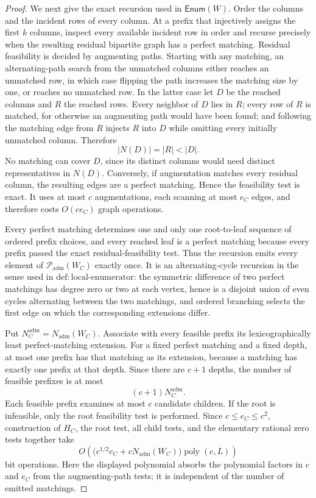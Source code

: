 \documentclass{article}
\begin{document}
\begin{proof}
We next give the exact recursion used in \(\mathsf{Enum}(W)\).  Order the columns and the incident rows of every column.  At a prefix that injectively assigns the first \(k\) columns, inspect every available incident row in order and recurse precisely when the resulting residual bipartite graph has a perfect matching.  Residual feasibility is decided by augmenting paths.  Starting with any matching, an alternating-path search from the unmatched columns either reaches an unmatched row, in which case flipping the path increases the matching size by one, or reaches no unmatched row.  In the latter case let \(D\) be the reached columns and \(R\) the reached rows.  Every neighbor of \(D\) lies in \(R\); every row of \(R\) is matched, for otherwise an augmenting path would have been found; and following the matching edge from \(R\) injects \(R\) into \(D\) while omitting every initially unmatched column.  Therefore
\[
 |N(D)|=|R|<|D|.
\]
No matching can cover \(D\), since its distinct columns would need distinct representatives in \(N(D)\).  Conversely, if augmentation matches every residual column, the resulting edges are a perfect matching.  Hence the feasibility test is exact.  It uses at most \(c\) augmentations, each scanning at most \(e_C\) edges, and therefore costs \(O(ce_C)\) graph operations.

Every perfect matching determines one and only one root-to-leaf sequence of ordered prefix choices, and every reached leaf is a perfect matching because every prefix passed the exact residual-feasibility test.  Thus the recursion emits every element of \(\mathcal P_{\mathrm{adm}}(W_C)\) exactly once.  It is an alternating-cycle recursion in the sense used in \(\mathrm{def:local\mbox{-}enumerator}\): the symmetric difference of two perfect matchings has degree zero or two at each vertex, hence is a disjoint union of even cycles alternating between the two matchings, and ordered branching selects the first edge on which the corresponding extensions differ.

Put \(N_C^{\mathrm{adm}}=N_{\mathrm{adm}}(W_C)\).  Associate with every feasible prefix its lexicographically least perfect-matching extension.  For a fixed perfect matching and a fixed depth, at most one prefix has that matching as its extension, because a matching has exactly one prefix at that depth.  Since there are \(c+1\) depths, the number of feasible prefixes is at most
\[
 (c+1)N_C^{\mathrm{adm}}.
\]
Each feasible prefix examines at most \(c\) candidate children.  If the root is infeasible, only the root feasibility test is performed.  Since \(c\le e_C\le c^2\), construction of \(H_C\), the root test, all child tests, and the elementary rational zero tests together take
\[
 O\!\left(\bigl(c^{1/2}e_C+cN_{\mathrm{adm}}(W_C)\bigr)
          \operatorname{poly}(c,L)\right)
\]
bit operations.  Here the displayed polynomial absorbs the polynomial factors in \(c\) and \(e_C\) from the augmenting-path tests; it is independent of the number of emitted matchings.


\end{proof}
\end{document}
